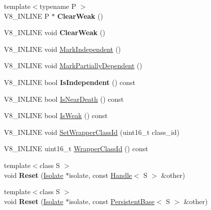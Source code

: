 \begin{DoxyCompactItemize}
\item 
\hypertarget{classv8_1_1_persistent_base_a444d27c00650e3663348024df08cb121}{}{\footnotesize template$<$typename P $>$ }\\V8\+\_\+\+I\+N\+L\+I\+N\+E P $\ast$ {\bfseries Clear\+Weak} ()\label{classv8_1_1_persistent_base_a444d27c00650e3663348024df08cb121}

\item 
\hypertarget{classv8_1_1_persistent_base_afe515daead108cceb1699b54051df13b}{}V8\+\_\+\+I\+N\+L\+I\+N\+E void {\bfseries Clear\+Weak} ()\label{classv8_1_1_persistent_base_afe515daead108cceb1699b54051df13b}

\item 
V8\+\_\+\+I\+N\+L\+I\+N\+E void \hyperlink{classv8_1_1_persistent_base_aed12b0a54bc5ade1fb44e3bdb3a1fe74}{Mark\+Independent} ()
\item 
V8\+\_\+\+I\+N\+L\+I\+N\+E void \hyperlink{classv8_1_1_persistent_base_a4a876d30dda0dfb812e82bb240e4686e}{Mark\+Partially\+Dependent} ()
\item 
\hypertarget{classv8_1_1_persistent_base_a2ed93b6be1b27c299906935ef35d2114}{}V8\+\_\+\+I\+N\+L\+I\+N\+E bool {\bfseries Is\+Independent} () const \label{classv8_1_1_persistent_base_a2ed93b6be1b27c299906935ef35d2114}

\item 
V8\+\_\+\+I\+N\+L\+I\+N\+E bool \hyperlink{classv8_1_1_persistent_base_a4a64c26d91ed6a276aa8a7ca4bb7683a}{Is\+Near\+Death} () const 
\item 
V8\+\_\+\+I\+N\+L\+I\+N\+E bool \hyperlink{classv8_1_1_persistent_base_a714b7794149df483837a2c6b09d52396}{Is\+Weak} () const 
\item 
V8\+\_\+\+I\+N\+L\+I\+N\+E void \hyperlink{classv8_1_1_persistent_base_ac4c979164b3ed4dc92319e6f5a108d3d}{Set\+Wrapper\+Class\+Id} (uint16\+\_\+t class\+\_\+id)
\item 
V8\+\_\+\+I\+N\+L\+I\+N\+E uint16\+\_\+t \hyperlink{classv8_1_1_persistent_base_a01a46bf4e69ed9a837639702ee234643}{Wrapper\+Class\+Id} () const 
\item 
\hypertarget{classv8_1_1_persistent_base_a1d3ad48623c429889afb03b557c926e0}{}{\footnotesize template$<$class S $>$ }\\void {\bfseries Reset} (\hyperlink{classv8_1_1_isolate}{Isolate} $\ast$isolate, const \hyperlink{classv8_1_1_handle}{Handle}$<$ S $>$ \&other)\label{classv8_1_1_persistent_base_a1d3ad48623c429889afb03b557c926e0}

\item 
\hypertarget{classv8_1_1_persistent_base_a67cbcedf77d176d3870fa4993e300b61}{}{\footnotesize template$<$class S $>$ }\\void {\bfseries Reset} (\hyperlink{classv8_1_1_isolate}{Isolate} $\ast$isolate, const \hyperlink{classv8_1_1_persistent_base}{Persistent\+Base}$<$ S $>$ \&other)\label{classv8_1_1_persistent_base_a67cbcedf77d176d3870fa4993e300b61}


\end{DoxyCompactItemize}
